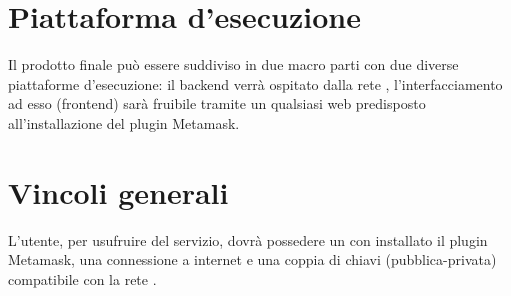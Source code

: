 \documentclass[AnalisiDeiRequisiti.tex]{subfiles}
\begin{document}
\section{Piattaforma d'esecuzione}
Il prodotto finale può essere suddiviso in due macro parti con due diverse piattaforme d'esecuzione: il backend verrà ospitato dalla rete , l'interfacciamento ad esso (frontend) sarà fruibile tramite un qualsiasi  web predisposto all'installazione del plugin Metamask.
\section{Vincoli generali}
L'utente, per usufruire del servizio, dovrà possedere un  con installato il plugin Metamask, una connessione a internet e una coppia di chiavi (pubblica-privata) compatibile con la rete .	
\end{document}
